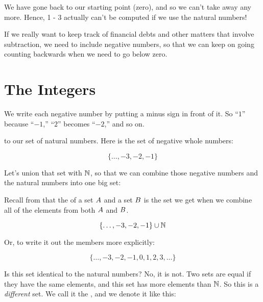 \documentclass[../../../main.tex]{subfiles}
\begin{document}
We have gone back to our starting point (zero), and so we can't take away any more. Hence, 1 - 3 actually can't be computed if we use the natural numbers!

If we really want to keep track of financial debts and other matters that involve subtraction, we need to include negative numbers, so that we can keep on going counting backwards when we need to go below zero.


\section{The Integers}

\begin{terminology}
  We write each negative number by putting a minus sign in front of it. So ``$1$'' because ``$-1$,'' ``$2$'' becomes ``$-2$,'' and so on.
\end{terminology}

 to our set of natural numbers. Here is the set of negative whole numbers:

\begin{equation*}
  \{ \ldots, -3, -2, -1 \}
\end{equation*}

Let's union that set with $\Nats/$, so that we can combine those negative numbers and the natural numbers into one big set:

\begin{aside}
  \begin{remark}
    Recall from  that the  of a set $A$ and a set $B$ is the set we get when we combine all of the elements from both $A$ and $B$.
  \end{remark}
\end{aside}

\begin{equation*}
  \{ \ldots, -3, -2, -1 \} \cup \Nats/
\end{equation*}

Or, to write it out the members more explicitly:

\begin{equation*}
  \{ \ldots, -3, -2, -1, 0, 1, 2, 3, \ldots \}
\end{equation*}

Is this set identical to the natural numbers? No, it is not. Two sets are equal if they have the same elements, and this set has more elements than $\Nats/$. So this is a \emph{different} set. We call it the , and we denote it like this: 
\end{document}
